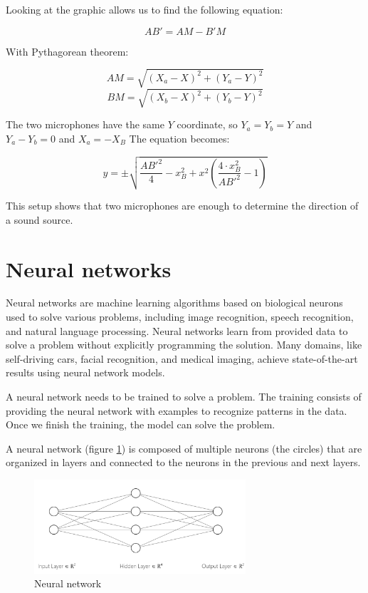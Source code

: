 Looking at the graphic allows us to find the following equation:

\begin{equation}
    AB' = AM-B'M
\end{equation}

With Pythagorean theorem: 

\begin{equation}
    AM = \sqrt{(X_{a}-X)^2 + (Y_{a}-Y)^2}
\end{equation}
\begin{equation}
    BM = \sqrt{(X_{b}-X)^2 + (Y_{b}-Y)^2}
\end{equation}

The two microphones have the same $Y$ coordinate, so $Y_{a} = Y_{b} = Y$ and $Y_{a}-Y_{b} = 0$ and $X_{a} = -X_{B}$ The equation becomes:

\begin{equation}
    y = \pm\sqrt{\frac{AB'^2}{4} - x^2_{B} + x^2(\frac{4\cdot x^2_{B}}{AB'^2} - 1)}
\end{equation}

This setup shows that two microphones are enough to determine the direction of a sound source.

\section{Neural networks}

Neural networks are machine learning algorithms based on biological neurons used to solve various problems, including image recognition, speech recognition, and natural language processing. Neural networks learn from provided data to solve a problem without explicitly programming the solution. Many domains, like self-driving cars, facial recognition, and medical imaging, achieve state-of-the-art results using neural network models. 

A neural network needs to be trained to solve a problem. The training consists of providing the neural network with examples to recognize patterns in the data. Once we finish the training, the model can solve the problem.

A neural network (figure \ref*{fig:neural_network}) is composed of multiple neurons (the circles) that are organized in layers and connected to the neurons in the previous and next layers. 

\begin{figure}[H]
    \centering
    \includegraphics[width=0.7\textwidth]{../Images/neural_network_example.png}
    \caption{Neural network}
    \label{fig:neural_network}
\end{figure}

